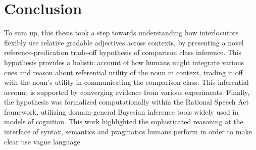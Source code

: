 

\section{Conclusion}
To sum up, this thesis took a step towards understanding how interlocutors flexibly use relative gradable adjectives across contexts, by presenting a novel reference-predication trade-off hypothesis of comparison class inference. 
This hypothesis provides a holistic account of how %
humans might integrate various cues and reason about referential utility of the noun in context, trading it off with the noun's utility in communicating the comparison class. This inferential account is supported by converging evidence from various experiments. Finally, the hypothesis was formalized computationally within the Rational Speech Act framework, utilizing domain-general Bayesian inference tools widely used in models of cognition. %
This work highlighted the sophisticated reasoning at the interface of syntax, semantics and pragmatics humans perform in order to make clear use vague language. %
